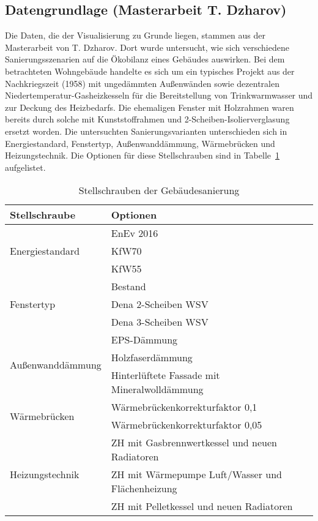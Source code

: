 \subsection{Datengrundlage (Masterarbeit T. Dzharov)}
Die Daten, die der Visualisierung zu Grunde liegen, stammen aus der Masterarbeit von T. Dzharov. Dort wurde untersucht, wie sich verschiedene Sanierungsszenarien auf die Ökobilanz eines Gebäudes auswirken. Bei dem betrachteten Wohngebäude handelte es sich um ein typisches Projekt aus der Nachkriegszeit (1958) mit ungedämmten Außenwänden sowie dezentralen Niedertemperatur-Gasheizkesseln für die Bereitstellung von Trinkwarmwasser und zur Deckung des Heizbedarfs. Die ehemaligen Fenster mit Holzrahmen waren bereits durch solche mit Kunststoffrahmen und 2-Scheiben-Isolierverglasung ersetzt worden. Die untersuchten Sanierungsvarianten unterschieden sich in Energiestandard, Fenstertyp, Außenwanddämmung, Wärmebrücken und Heizungstechnik. Die Optionen für diese Stellschrauben sind in Tabelle~\ref{tab:layers} aufgelistet. 
 
\begin{table}[htpb]
	\caption[Example table]{Stellschrauben der Gebäudesanierung}\label{tab:layers}
	\centering
	\begin{tabular}{l p{10cm}}
		\toprule
		Stellschraube & Optionen \\
		\midrule
		\multirow{3}{*}{Energiestandard} & EnEv 2016\\
		& KfW70 \\
		& KfW55\\ \hline
	    \multirow{3}{*}{Fenstertyp} & Bestand\\
		& Dena 2-Scheiben WSV \\
		& Dena 3-Scheiben WSV\\ \hline
	    \multirow{3}{*}{Außenwanddämmung} & EPS-Dämmung\\
		& Holzfaserdämmung \\
		& Hinterlüftete Fassade mit Mineralwolldämmung\\ \hline
	    \multirow{2}{*}{Wärmebrücken} & Wärmebrückenkorrekturfaktor 0,1\\
		& Wärmebrückenkorrekturfaktor 0,05 \\ \hline
	    \multirow{3}{*}{Heizungstechnik} & ZH mit Gasbrennwertkessel und neuen Radiatoren\\
		& ZH mit Wärmepumpe Luft/Wasser und Flächenheizung \\
		& ZH mit Pelletkessel und neuen Radiatoren\\ \hline
		\bottomrule
	\end{tabular}
\end{table}

